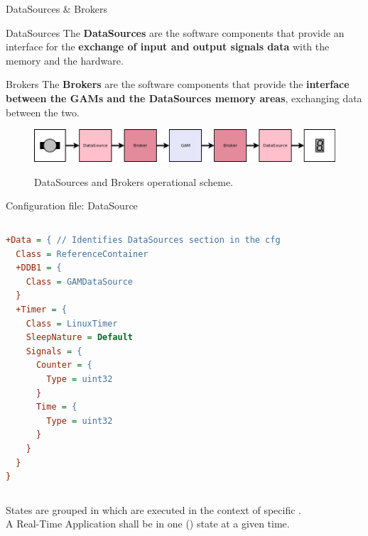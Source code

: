 \begin{frame}{DataSources \& Brokers}
	\begin{block}{DataSources}
		The \textbf{DataSources} are the software components that provide an interface for the \textbf{exchange of input and output signals data} with the memory and the hardware.
	\end{block}
	\begin{block}{Brokers}
		The \textbf{Brokers} are the software components that provide the \textbf{interface between the GAMs and the DataSources memory areas}, exchanging data between the two.
	\end{block}
  \bigskip
	\begin{figure}
		\centering
		\includegraphics[scale=.35]{DataSources.png}
		\label{fig:datasources}
		\caption{DataSources and Brokers operational scheme.}
	\end{figure}
\end{frame}

\begin{frame}[fragile]{Configuration file: DataSource}
	\begin{columns}
		\begin{lstlisting}[style=small, language=cfg, caption=DataSource configuration structure.]
+Data = { // Identifies DataSources section in the cfg
  Class = ReferenceContainer
  +DDB1 = {
    Class = GAMDataSource
  }
  +Timer = {
    Class = LinuxTimer
    SleepNature = Default
    Signals = {
      Counter = {
	    Type = uint32
	  }
      Time = {
        Type = uint32
      }
    }
  }
}\end{lstlisting}
	\end{columns}
\end{frame}

\begin{frame}{States}
		 are grouped in  which are executed in the context of specific .\\
    \bigskip
		A Real-Time Application shall be in one () state at a given time.
\end{frame}


